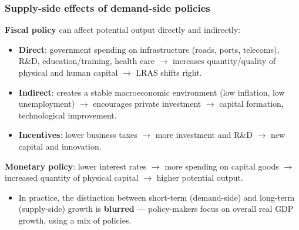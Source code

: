 \documentclass[a4paper,12pt]{article}
\begin{document}
\subsubsection*{Supply-side effects of demand-side policies}
\textbf{Fiscal policy} can affect potential output directly and indirectly:
\begin{itemize}
  \item \textbf{Direct}: government spending on infrastructure (roads, ports, telecoms), R\&D, education/training, health care $\to$ increases quantity/quality of physical and human capital $\to$ LRAS shifts right.
  \item \textbf{Indirect}: creates a stable macroeconomic environment (low inflation, low unemployment) $\to$ encourages private investment $\to$ capital formation, technological improvement.
  \item \textbf{Incentives}: lower business taxes $\to$ more investment and R\&D $\to$ new capital and innovation.
\end{itemize}
\textbf{Monetary policy}: lower interest rates $\to$ more spending on capital goods $\to$ increased quantity of physical capital $\to$ higher potential output.
\begin{center}
\begin{itemize}
  \item In practice, the distinction between short-term (demand-side) and long-term (supply-side) growth is \textbf{blurred} --- policy-makers focus on overall real GDP growth, using a mix of policies.
\end{itemize}
\end{center}
\end{document}

